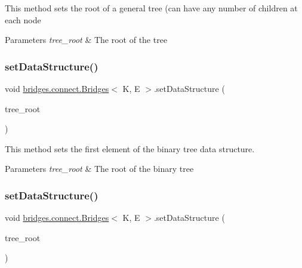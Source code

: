 This method sets the root of a general tree (can have any number of children at each node


\begin{DoxyParams}{Parameters}
{\em tree\+\_\+root} & The root of the tree \\
\hline
\end{DoxyParams}
\hypertarget{classbridges_1_1connect_1_1_bridges_a02a3d74b381473b5d97a8f8194df9b40}{}\label{classbridges_1_1connect_1_1_bridges_a02a3d74b381473b5d97a8f8194df9b40} 
\subsubsection{\texorpdfstring{set\+Data\+Structure()}{setDataStructure()}\hspace{0.1cm}{\footnotesize\ttfamily [8/12]}}
{\footnotesize\ttfamily void \hyperlink{classbridges_1_1connect_1_1_bridges}{bridges.\+connect.\+Bridges}$<$ K, E $>$.set\+Data\+Structure (\begin{DoxyParamCaption}\item[{\hyperlink{classbridges_1_1base_1_1_bin_tree_element}{Bin\+Tree\+Element}$<$ E $>$}]{tree\+\_\+root }\end{DoxyParamCaption})}

This method sets the first element of the binary tree data structure.


\begin{DoxyParams}{Parameters}
{\em tree\+\_\+root} & The root of the binary tree \\
\hline
\end{DoxyParams}
\hypertarget{classbridges_1_1connect_1_1_bridges_adb01a9385de48ef267bdfd22758fb361}{}\label{classbridges_1_1connect_1_1_bridges_adb01a9385de48ef267bdfd22758fb361} 
\subsubsection{\texorpdfstring{set\+Data\+Structure()}{setDataStructure()}\hspace{0.1cm}{\footnotesize\ttfamily [9/12]}}
{\footnotesize\ttfamily void \hyperlink{classbridges_1_1connect_1_1_bridges}{bridges.\+connect.\+Bridges}$<$ K, E $>$.set\+Data\+Structure (\begin{DoxyParamCaption}\item[{\hyperlink{classbridges_1_1base_1_1_b_s_t_element}{B\+S\+T\+Element}$<$ K, E $>$}]{tree\+\_\+root }\end{DoxyParamCaption})}


